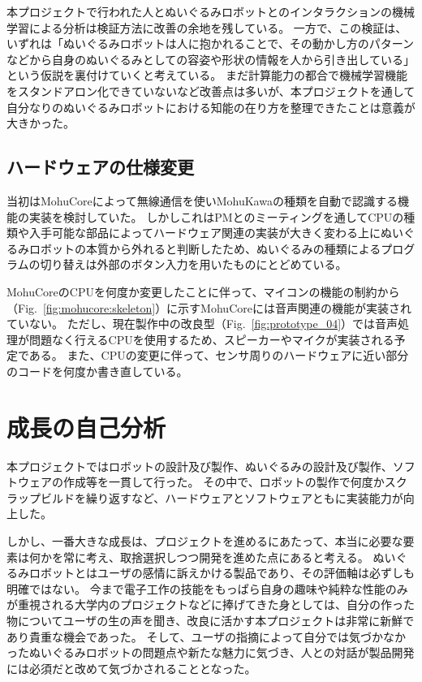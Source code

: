 \documentclass[uplatex,a4paper,12pt]{jsarticle}
\renewcommand{\figurename}{Fig.}
\newcommand{\figref}[1]{\figurename~\ref{#1}}
\begin{document}
本プロジェクトで行われた人とぬいぐるみロボットとのインタラクションの機械学習による分析は検証方法に改善の余地を残している。
一方で、この検証は、いずれは「ぬいぐるみロボットは人に抱かれることで、その動かし方のパターンなどから自身のぬいぐるみとしての容姿や形状の情報を人から引き出している」という仮説を裏付けていくと考えている。
まだ計算能力の都合で機械学習機能をスタンドアロン化できていないなど改善点は多いが、本プロジェクトを通して自分なりのぬいぐるみロボットにおける知能の在り方を整理できたことは意義が大きかった。

\subsection{ハードウェアの仕様変更}
当初はMohuCoreによって無線通信を使いMohuKawaの種類を自動で認識する機能の実装を検討していた。
しかしこれはPMとのミーティングを通してCPUの種類や入手可能な部品によってハードウェア関連の実装が大きく変わる上にぬいぐるみロボットの本質から外れると判断したため、ぬいぐるみの種類によるプログラムの切り替えは外部のボタン入力を用いたものにとどめている。

MohuCoreのCPUを何度か変更したことに伴って、マイコンの機能の制約から（\figref{fig:mohucore:skeleton}）に示すMohuCoreには音声関連の機能が実装されていない。
ただし、現在製作中の改良型（\figref{fig:prototype_04}）では音声処理が問題なく行えるCPUを使用するため、スピーカーやマイクが実装される予定である。
また、CPUの変更に伴って、センサ周りのハードウェアに近い部分のコードを何度か書き直している。




\section{成長の自己分析}
本プロジェクトではロボットの設計及び製作、ぬいぐるみの設計及び製作、ソフトウェアの作成等を一貫して行った。
その中で、ロボットの製作で何度かスクラップビルドを繰り返すなど、ハードウェアとソフトウェアともに実装能力が向上した。

しかし、一番大きな成長は、プロジェクトを進めるにあたって、本当に必要な要素は何かを常に考え、取捨選択しつつ開発を進めた点にあると考える。
ぬいぐるみロボットとはユーザの感情に訴えかける製品であり、その評価軸は必ずしも明確ではない。
今まで電子工作の技能をもっぱら自身の趣味や純粋な性能のみが重視される大学内のプロジェクトなどに捧げてきた身としては、自分の作った物についてユーザの生の声を聞き、改良に活かす本プロジェクトは非常に新鮮であり貴重な機会であった。
そして、ユーザの指摘によって自分では気づかなかったぬいぐるみロボットの問題点や新たな魅力に気づき、人との対話が製品開発には必須だと改めて気づかされることとなった。
\end{document}
